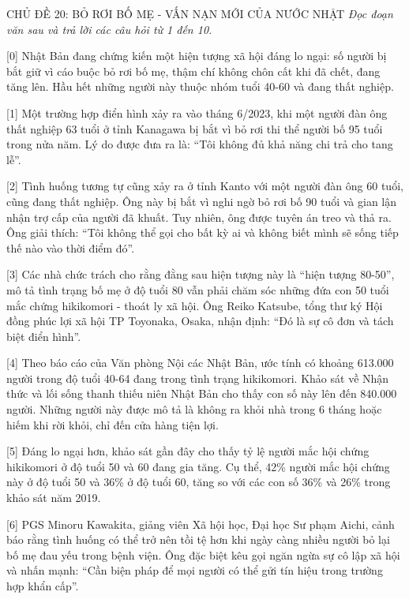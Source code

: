 \documentclass[12pt,a4paper,twoside]{article}
\newenvironment{readingpassage}[1][]{%
    \begin{tcolorbox}[enhanced, colback=grayLight, colframe=secondaryBlue,
        coltitle=textDark, fonttitle=\bfseries, title={#1},
        rounded corners, arc=3mm, boxrule=1pt,
        left=15pt, right=15pt, top=10pt, bottom=10pt,
        breakable, before skip=10pt, after skip=10pt, drop fuzzy shadow]
    \setstretch{1.3}
}{\end{tcolorbox}}
\begin{document}
\newpage
\label{a_cd20}
\begin{topicbox}{\large CHỦ ĐỀ 20: BỎ RƠI BỐ MẸ - VẤN NẠN MỚI CỦA NƯỚC NHẬT}
\vspace{8pt}
\textit{Đọc đoạn văn sau và trả lời các câu hỏi từ 1 đến 10.}
\vspace{6pt}
\end{topicbox}
\vspace{5pt}
\begin{readingpassage}[]
[0] Nhật Bản đang chứng kiến một hiện tượng xã hội đáng lo ngại: số người bị bắt giữ vì cáo buộc bỏ rơi bố mẹ, thậm chí không chôn cất khi đã chết, đang tăng lên. Hầu hết những người này thuộc nhóm tuổi 40-60 và đang thất nghiệp.

[1] Một trường hợp điển hình xảy ra vào tháng 6/2023, khi một người đàn ông thất nghiệp 63 tuổi ở tỉnh Kanagawa bị bắt vì bỏ rơi thi thể người bố 95 tuổi trong nửa năm. Lý do được đưa ra là: ``Tôi không đủ khả năng chi trả cho tang lễ''.

[2] Tình huống tương tự cũng xảy ra ở tỉnh Kanto với một người đàn ông 60 tuổi, cũng đang thất nghiệp. Ông này bị bắt vì nghi ngờ bỏ rơi bố 90 tuổi và gian lận nhận trợ cấp của người đã khuất. Tuy nhiên, ông được tuyên án treo và thả ra. Ông giải thích: ``Tôi không thể gọi cho bất kỳ ai và không biết mình sẽ sống tiếp thế nào vào thời điểm đó''.

[3] Các nhà chức trách cho rằng đằng sau hiện tượng này là ``hiện tượng 80-50'', mô tả tình trạng bố mẹ ở độ tuổi 80 vẫn phải chăm sóc những đứa con 50 tuổi mắc chứng hikikomori - thoát ly xã hội. Ông Reiko Katsube, tổng thư ký Hội đồng phúc lợi xã hội TP Toyonaka, Osaka, nhận định: ``Đó là sự cô đơn và tách biệt điển hình''.

[4] Theo báo cáo của Văn phòng Nội các Nhật Bản, ước tính có khoảng 613.000 người trong độ tuổi 40-64 đang trong tình trạng hikikomori. Khảo sát về Nhận thức và lối sống thanh thiếu niên Nhật Bản cho thấy con số này lên đến 840.000 người. Những người này được mô tả là không ra khỏi nhà trong 6 tháng hoặc hiếm khi rời khỏi, chỉ đến cửa hàng tiện lợi.

[5] Đáng lo ngại hơn, khảo sát gần đây cho thấy tỷ lệ người mắc hội chứng hikikomori ở độ tuổi 50 và 60 đang gia tăng. Cụ thể, 42\% người mắc hội chứng này ở độ tuổi 50 và 36\% ở độ tuổi 60, tăng so với các con số 36\% và 26\% trong khảo sát năm 2019.

[6] PGS Minoru Kawakita, giảng viên Xã hội học, Đại học Sư phạm Aichi, cảnh báo rằng tình huống có thể trở nên tồi tệ hơn khi ngày càng nhiều người bỏ lại bố mẹ đau yếu trong bệnh viện. Ông đặc biệt kêu gọi ngăn ngừa sự cô lập xã hội và nhấn mạnh: ``Cần biện pháp để mọi người có thể gửi tín hiệu trong trường hợp khẩn cấp''.


\end{readingpassage}
\end{document}
